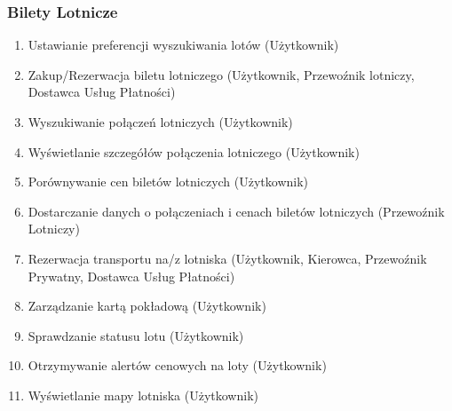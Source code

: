 \documentclass[a4paper,12pt]{article}
\begin{document}
\subsubsection{Bilety Lotnicze}
\begin{enumerate}[label=\arabic*.]
    \item Ustawianie preferencji wyszukiwania lotów (Użytkownik)
    \item Zakup/Rezerwacja biletu lotniczego (Użytkownik, Przewoźnik lotniczy, Dostawca Usług Płatności)
    \item Wyszukiwanie połączeń lotniczych (Użytkownik)
    \item Wyświetlanie szczegółów połączenia lotniczego (Użytkownik)
    \item Porównywanie cen biletów lotniczych (Użytkownik)
    \item Dostarczanie danych o połączeniach i cenach biletów lotniczych (Przewoźnik Lotniczy)
    \item Rezerwacja transportu na/z lotniska (Użytkownik, Kierowca, Przewoźnik Prywatny, Dostawca Usług Płatności)
    \item Zarządzanie kartą pokładową (Użytkownik)
    \item Sprawdzanie statusu lotu (Użytkownik)
    \item Otrzymywanie alertów cenowych na loty (Użytkownik)
    \item Wyświetlanie mapy lotniska (Użytkownik)
\end{enumerate}
\end{document}
